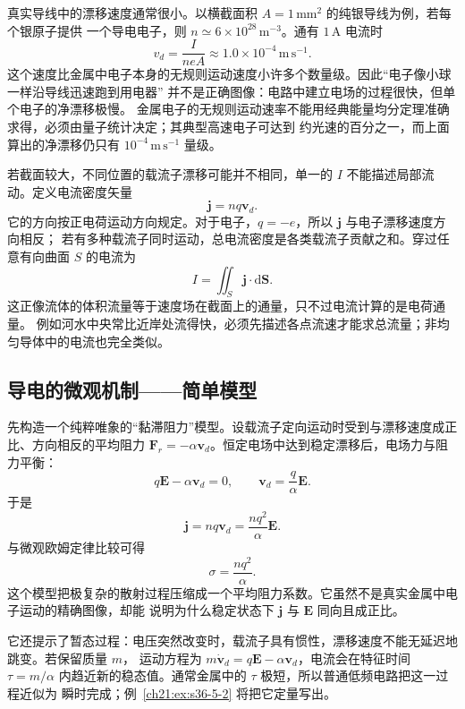 {真实导线中的漂移速度通常很小。以横截面积 $A=1\,\mathrm{mm^2}$ 的纯银导线为例，若每个银原子提供
一个导电电子，则 $n\simeq6\times10^{28}\,\mathrm{m^{-3}}$。通有 $1\,\mathrm A$ 电流时
\begin{equation}
  \boxed{v_d=\frac{I}{neA}\approx1.0\times10^{-4}\,\mathrm{m\,s^{-1}}}.
\end{equation}
这个速度比金属中电子本身的无规则运动速度小许多个数量级。因此“电子像小球一样沿导线迅速跑到用电器”
并不是正确图像：电路中建立电场的过程很快，但单个电子的净漂移极慢。
金属电子的无规则运动速率不能用经典能量均分定理准确求得，必须由量子统计决定；其典型高速电子可达到
约光速的百分之一，而上面算出的净漂移仍只有 $10^{-4}\,\mathrm{m\,s^{-1}}$ 量级。

若截面较大，不同位置的载流子漂移可能并不相同，单一的 $I$ 不能描述局部流动。定义电流密度矢量
\begin{equation}
  \boxed{\boldsymbol j=nq\boldsymbol v_d}.
\end{equation}
它的方向按正电荷运动方向规定。对于电子，$q=-e$，所以 $\boldsymbol j$ 与电子漂移速度方向相反；
若有多种载流子同时运动，总电流密度是各类载流子贡献之和。穿过任意有向曲面 $S$ 的电流为
\[
  I=\iint_S\boldsymbol j\cdot\mathrm d\boldsymbol S.
\]
这正像流体的体积流量等于速度场在截面上的通量，只不过电流计算的是电荷通量。
例如河水中央常比近岸处流得快，必须先描述各点流速才能求总流量；非均匀导体中的电流也完全类似。


\subsection{导电的微观机制——简单模型}


先构造一个纯粹唯象的“黏滞阻力”模型。设载流子定向运动时受到与漂移速度成正比、方向相反的平均阻力
$\boldsymbol F_r=-\alpha\boldsymbol v_d$。恒定电场中达到稳定漂移后，电场力与阻力平衡：
\[
  q\boldsymbol E-\alpha\boldsymbol v_d=0,
  \qquad \boldsymbol v_d=\frac q\alpha\boldsymbol E.
\]
于是
\[
  \boldsymbol j=nq\boldsymbol v_d=\frac{nq^2}{\alpha}\boldsymbol E.
\]
与微观欧姆定律比较可得
\begin{equation}
  \boxed{\sigma=\frac{nq^2}{\alpha}}.
\end{equation}
这个模型把极复杂的散射过程压缩成一个平均阻力系数。它虽然不是真实金属中电子运动的精确图像，却能
说明为什么稳定状态下 $\boldsymbol j$ 与 $\boldsymbol E$ 同向且成正比。

它还提示了暂态过程：电压突然改变时，载流子具有惯性，漂移速度不能无延迟地跳变。若保留质量 $m$，
运动方程为 $m\dot{\boldsymbol v}_d=q\boldsymbol E-\alpha\boldsymbol v_d$，电流会在特征时间
$\tau=m/\alpha$ 内趋近新的稳态值。通常金属中的 $\tau$ 极短，所以普通低频电路把这一过程近似为
瞬时完成；例~\ref{ch21:ex:s36-5-2} 将把它定量写出。


}
